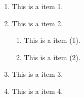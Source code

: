 \documentclass{ctexart}
\begin{document}
\begin{enumerate}[1.]
\item This is a item 1.
\item This is a item 2.
  \begin{enumerate}[(1)]
  \item This is a item (1).
  \item This is a item (2).
  \end{enumerate}
\item This is a item 3.
\item This is a item 4.
\end{enumerate}
\end{document}
